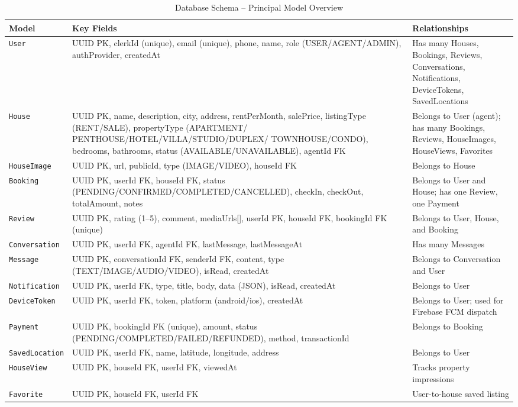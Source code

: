 \documentclass[12pt,a4paper]{report}
\begin{document}
\begin{table}[H]
\caption{Database Schema -- Principal Model Overview}
\label{tab:schema}
\centering
\small
{}
\begin{tabularx}{\textwidth}{|l|X|X|}
\hline
\textbf{Model} & \textbf{Key Fields} & \textbf{Relationships} \\
\hline
\texttt{User} & UUID PK, clerkId (unique), email (unique), phone, name, role (USER/AGENT/ADMIN), authProvider, createdAt & Has many Houses, Bookings, Reviews, Conversations, Notifications, DeviceTokens, SavedLocations \\
\hline
\texttt{House} & UUID PK, name, description, city, address, rentPerMonth, salePrice, listingType (RENT/SALE), propertyType (APARTMENT/ PENTHOUSE/HOTEL/VILLA/STUDIO/DUPLEX/ TOWNHOUSE/CONDO), bedrooms, bathrooms, status (AVAILABLE/UNAVAILABLE), agentId FK & Belongs to User (agent); has many Bookings, Reviews, HouseImages, HouseViews, Favorites \\
\hline
\texttt{HouseImage} & UUID PK, url, publicId, type (IMAGE/VIDEO), houseId FK & Belongs to House \\
\hline
\texttt{Booking} & UUID PK, userId FK, houseId FK, status (PENDING/CONFIRMED/COMPLETED/CANCELLED), checkIn, checkOut, totalAmount, notes & Belongs to User and House; has one Review, one Payment \\
\hline
\texttt{Review} & UUID PK, rating (1--5), comment, mediaUrls[], userId FK, houseId FK, bookingId FK (unique) & Belongs to User, House, and Booking \\
\hline
\texttt{Conversation} & UUID PK, userId FK, agentId FK, lastMessage, lastMessageAt & Has many Messages \\
\hline
\texttt{Message} & UUID PK, conversationId FK, senderId FK, content, type (TEXT/IMAGE/AUDIO/VIDEO), isRead, createdAt & Belongs to Conversation and User \\
\hline
\texttt{Notification} & UUID PK, userId FK, type, title, body, data (JSON), isRead, createdAt & Belongs to User \\
\hline
\texttt{DeviceToken} & UUID PK, userId FK, token, platform (android/ios), createdAt & Belongs to User; used for Firebase FCM dispatch \\
\hline
\texttt{Payment} & UUID PK, bookingId FK (unique), amount, status (PENDING/COMPLETED/FAILED/REFUNDED), method, transactionId & Belongs to Booking \\
\hline
\texttt{SavedLocation} & UUID PK, userId FK, name, latitude, longitude, address & Belongs to User \\
\hline
\texttt{HouseView} & UUID PK, houseId FK, userId FK, viewedAt & Tracks property impressions \\
\hline
\texttt{Favorite} & UUID PK, houseId FK, userId FK & User-to-house saved listing \\
\hline
\end{tabularx}
\end{table}
\end{document}
